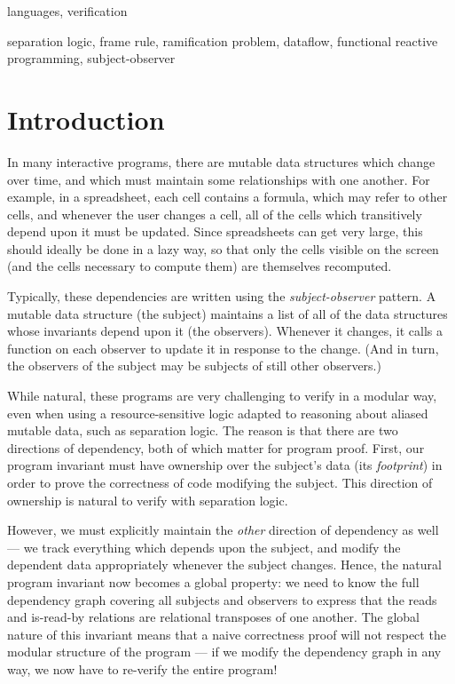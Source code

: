 \documentclass[natbib]{sigplanconf}
\begin{document}

\terms
languages, verification

\keywords
separation logic, frame rule, ramification problem, dataflow, 
functional reactive programming, subject-observer

\section{Introduction}

In many interactive programs, there are mutable data structures which
change over time, and which must maintain some relationships with one
another. For example, in a spreadsheet, each cell contains a formula,
which may refer to other cells, and whenever the user changes a cell,
all of the cells which transitively depend upon it must be
updated. Since spreadsheets can get very large, this should ideally be
done in a lazy way, so that only the cells visible on the screen (and
the cells necessary to compute them) are themselves recomputed.

Typically, these dependencies are written using the
\emph{subject-observer} pattern. A mutable data structure (the
subject) maintains a list of all of the data structures whose
invariants depend upon it (the observers). Whenever it changes, it
calls a function on each observer to update it in response
to the change. (And in turn, the observers of the subject may be
subjects of still other observers.)

While natural, these programs are very challenging to verify in a
modular way, even when using a resource-sensitive logic adapted to
reasoning about aliased mutable data, such as separation logic. The
reason is that there are two directions of dependency, both of which
matter for program proof. First, our program invariant must have
ownership over the subject's data (its \emph{footprint}) in order to
prove the correctness of code modifying the subject. This direction
of ownership is natural to verify with separation logic. 

However, we must explicitly maintain the \emph{other} direction of
dependency as well --- we track everything which depends upon the
subject, and modify the dependent data appropriately whenever the subject changes.
Hence, the natural program invariant now becomes a global property:
we need to know the full dependency graph covering all subjects and
observers to express that the reads and is-read-by relations
are relational transposes of one another. The global nature of this
invariant means that a naive correctness proof will not respect the
modular structure of the program --- if we modify the dependency graph
in any way, we now have to re-verify the entire program!
\end{document}
